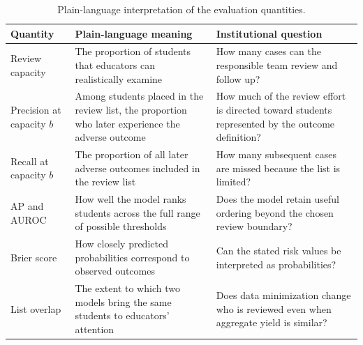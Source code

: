 \documentclass[education,article,submit,moreauthors]{Definitions/mdpi}
\begin{document}
\begin{table}[H]
\centering
\caption{Plain-language interpretation of the evaluation quantities.}
\label{tab:interpretation}
\small
\begin{tabularx}{\textwidth}{p{}p{}X}
\toprule
Quantity & Plain-language meaning & Institutional question \\
\midrule
Review capacity & The proportion of students that educators can realistically examine & How many cases can the responsible team review and follow up? \\
Precision at capacity $b$ & Among students placed in the review list, the proportion who later experience the adverse outcome & How much of the review effort is directed toward students represented by the outcome definition? \\
Recall at capacity $b$ & The proportion of all later adverse outcomes included in the review list & How many subsequent cases are missed because the list is limited? \\
AP and AUROC & How well the model ranks students across the full range of possible thresholds & Does the model retain useful ordering beyond the chosen review boundary? \\
Brier score & How closely predicted probabilities correspond to observed outcomes & Can the stated risk values be interpreted as probabilities? \\
List overlap & The extent to which two models bring the same students to educators' attention & Does data minimization change who is reviewed even when aggregate yield is similar? \\
\bottomrule
\end{tabularx}
\end{table}

\vspace{6pt}

\end{document}
